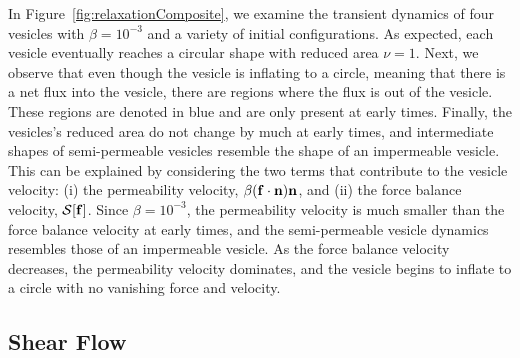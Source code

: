 \documentclass[9pt,twocolumn,twoside,lineno]{pnas-new}
\newif\ifTikz
\begin{document}
In Figure~\ref{fig:relaxationComposite}, we examine the transient
dynamics of four vesicles with $\beta = 10^{-3}$ and a variety of
initial configurations. As expected, each vesicle eventually
reaches a circular shape with reduced area $\nu=1$. Next, we observe
that even though the vesicle is inflating to a circle, meaning that
there is a net flux into the vesicle, there are regions where the flux
is out of the vesicle. These regions are denoted in blue and are only
present at early times. Finally, the vesicles's reduced area do not 
change by much at early times, and intermediate shapes of semi-permeable vesicles
resemble the shape of an impermeable vesicle. This can be explained by
considering the two terms that contribute to the vesicle velocity: (i)
the permeability velocity, $\beta(\mathbf{f} \cdot \mathbf{n}) \mathbf{n}$, and (ii) the
force balance velocity, $\mathcal{S}[\mathbf{f}]$. Since $\beta = 10^{-3}$, the
permeability velocity is much smaller than the force balance velocity at
early times, and the semi-permeable vesicle dynamics resembles those of
an impermeable vesicle. As the force balance velocity decreases, the
permeability velocity dominates, and the vesicle begins to inflate to a
circle with no vanishing force and velocity. 

\begin{figure*}[htp]
  \centering
  \ifTikz
  
  \fi
  \caption{\label{fig:relaxationComposite} (a): Snapshots of four
  semi-permeable vesicles with $\beta = 10^{-3}$ submerged in a
  quiescent flow. The fluid flux along the red regions is into the
  vesicle, and the fluid flux along the blue regions is out of the
  vesicle. In all cases, the vesicle reaches a steady-state circular
  shape. (b): The reduced area of each of the simulations. The
  particular snapshots in (a) occur at the marks along the curve.}
\end{figure*}




\subsection*{Shear Flow}
\begin{figure*}[htp]
  \centering
  \ifTikz
  
  \fi
  \caption{\label{fig:shearComposite} (a) The reduced area of a
  semi-permeable vesicle with $\beta = 10^{-3}$ initialized with four
  different reduced areas in a shear flow with two different flow rates.
  (b) The steady state shape of a semi-permeable vesicle with varying
  flow rates and semi-permeability rates. The circled vesicles
  correspond to the simulations in part (a).}
\end{figure*}
\end{document}
